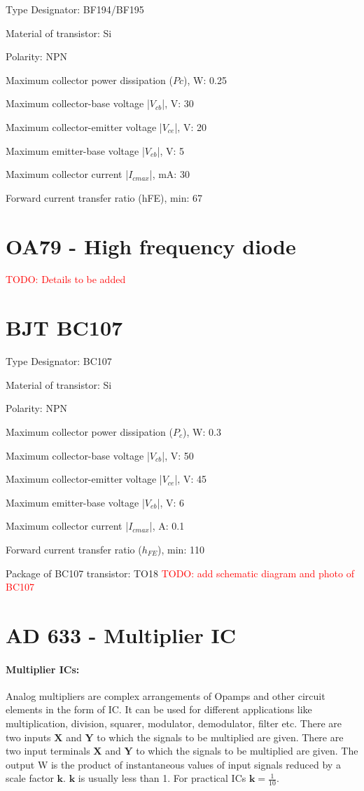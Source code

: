 Type Designator: BF194/BF195

Material of transistor: Si

Polarity: NPN

Maximum collector power dissipation ($Pc$), W: 0.25

Maximum collector-base voltage |$V_{cb}$|, V: 30

Maximum collector-emitter voltage |$V_{ce}$|, V: 20

Maximum emitter-base voltage |$V_{eb}$|, V: 5

Maximum collector current |$I_{c max}$|, mA: 30

Forward current transfer ratio (hFE), min: 67


\section{OA79 - High frequency diode}
\textcolor{red}{TODO: Details to be added}
\section{BJT BC107}
\label{BC107}
Type Designator: BC107

Material of transistor: Si

Polarity: NPN

Maximum collector power dissipation ($P_c$), W: 0.3

Maximum collector-base voltage |$V_{cb}$|, V: 50

Maximum collector-emitter voltage |$V_{ce}$|, V: 45

Maximum emitter-base voltage |$V_{eb}$|, V: 6

Maximum collector current |$I_{cmax}$|, A: 0.1

Forward current transfer ratio ($h_{FE}$), min: 110

Package of BC107 transistor: TO18
\textcolor{red}{TODO: add schematic diagram and photo of BC107}



\section{AD 633 - Multiplier IC}
\label{AD633}
\paragraph{Multiplier ICs:}
 Analog multipliers are complex arrangements of Opamps and other circuit elements in the form of IC. It can be used for different applications like multiplication, division, squarer, modulator, demodulator, filter etc. There are two inputs $\textbf{X}$ and $\textbf{Y}$ to which the signals to be multiplied are given.
There are two input terminals $\textbf{X}$ and $\textbf{Y}$ to which the signals to be multiplied are given. The output W is the product of instantaneous values of input signals reduced by a scale factor $\textbf{k}$. $\textbf{k}$ is usually less than 1. For practical ICs $\textbf{k}=\frac{1}{10}$.

